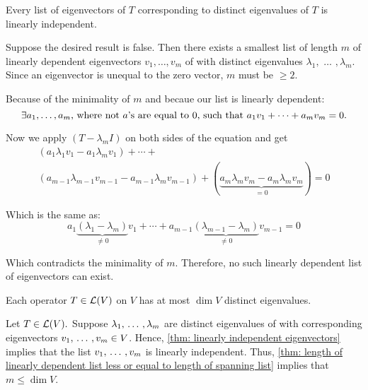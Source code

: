 \setcounter{thm}{10}
\begin{thm}
  \label{thm: linearly independent eigenvectors}
  Every list of eigenvectors of $T$ corresponding to distinct eigenvalues of $T$ is linearly independent.
\end{thm}
\begin{prf}
  Suppose the desired result is false. Then there exists a smallest list of length $m$ of linearly depen\-dent eigenvectors $v_1, \dots, v_m$ of with distinct eigenvalues $\lambda_1,$ $\dots$ $,\lambda_m$. Since an eigenvector is unequal to the zero vector, $m$ must be $\geq 2$.

  Because of the minimality of $m$ and becaue our list is linearly dependent:
  \begin{equation}
    \exists a_1, \dots, a_m$, where not $a$'s are equal to $0$, such that $a_1 v_1 + \cdots + a_m v_m = 0.
  \end{equation}

  Now we apply $(T-\lambda_m I)$ on both sides of the equation and get
  \begin{equation}
    \begin{gathered}
      (a_1 \lambda_1 v_1 - a_1 \lambda_m v_1)
      + \cdots + \\
      (a_{m-1} \lambda_{m-1} v_{m-1} - a_{m-1} \lambda_{m} v_{m-1}) +
      (\underbrace{a_m \lambda_m v_m -a_m \lambda_m v_m}_{=0}) =0
    \end{gathered}
  \end{equation}

  Which is the same as:
  \begin{equation}
    a_1 \underbrace{(\lambda_1 - \lambda_m)}_{\neq 0} v_1 + \cdots + a_{m-1} \underbrace{(\lambda_{m-1}-\lambda_{m})}_{\neq 0} v_{m-1}=0
  \end{equation}

  Which contradicts the minimality of $m$. Therefore, no such linearly dependent list of eigenvectors can exist.
\end{prf}

\begin{thm}
  \label{thm: operator cannot have more eigenvalues than dimension of vector space}
  Each operator $T \in \mathcal{L}(V)$ on $V$ has at most $\dim V$ distinct eigenvalues.
\end{thm}
\begin{prf}
  Let $T \in \mathcal{L}(V).$ Suppose $\lambda_1, {\, \ldots \,\,}, \lambda_m$ are distinct eigenvalues of with corresponding eigenvectors $v_1, {\, \ldots \,\,}, v_m \in V$. Hence, \ref{thm: linearly independent eigenvectors} implies that the list $v_1, {\, \ldots \,\,}, v_m$ is linearly independent. Thus, \ref{thm: length of linearly dependent list less or equal to length of spanning list}
  implies that $m \leq \dim V$.
\end{prf}



